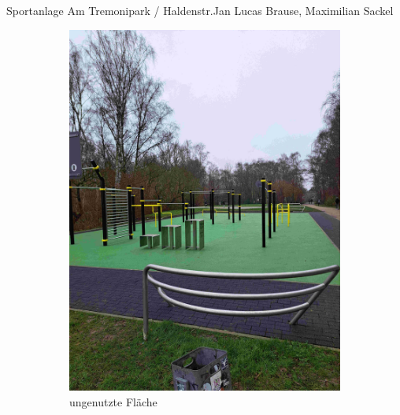 \documentclass{../../templates/amendment}
\begin{document}
\begin{boxed}{Sportanlage Am Tremonipark / Haldenstr.}{Jan Lucas Brause, Maximilian Sackel}
\begin{figure}[htpb]
\begin{subfigure}[]{0.32\textwidth}
            \begin{center}
                \includegraphics[width=\linewidth]{pictures/photo3.jpg}
                \caption{ungenutzte Fläche}%
            \end{center}
        \end{subfigure}
        \begin{subfigure}[]{0.32\textwidth}
            \begin{center}

\end{center}
\end{subfigure}
\end{figure}
\end{boxed}
\end{document}
